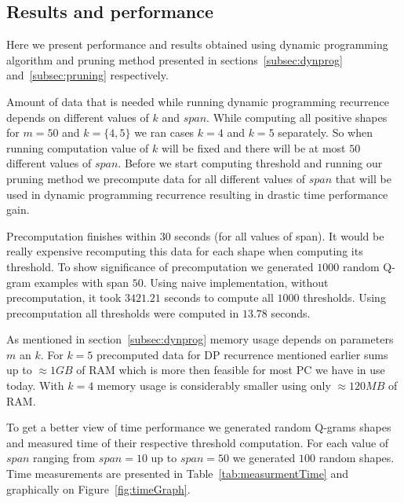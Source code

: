 \documentclass[paper=a4, fontsize=11pt]{scrartcl} %
\numberwithin{equation}{section} %
\numberwithin{figure}{section} %
\numberwithin{table}{section} %
\begin{document}

\subsection{Results and performance}

Here we present performance and results obtained using dynamic programming
algorithm and pruning method presented in sections~\ref{subsec:dynprog}
and~\ref{subsec:pruning} respectively.

Amount of data that is needed while running dynamic programming recurrence
depends on different values of $k$ and $span$. While computing all positive shapes for
$m=50$ and $k=\{4,5\}$ we ran cases $k=4$ and $k=5$ separately. So when running
computation value of $k$ will be fixed and there will be at most $50$ different
values of $span$. Before we start computing threshold and running our pruning
method we precompute data for all different values of $span$ that will be used
in dynamic programming recurrence resulting in drastic time performance gain.

Precomputation finishes within $30$ seconds (for all values of span). It would
be really expensive recomputing this data for each shape when computing its threshold.
To show significance of precomputation we generated $1000$ random Q-gram
examples with span $50$. Using naive implementation, without precomputation, it
took $3421.21$ seconds to compute all $1000$ thresholds. Using precomputation
all thresholds were computed in $13.78$ seconds.

As mentioned in section~\ref{subsec:dynprog} memory usage depends on parameters
$m$ an $k$. For $k=5$ precomputed data for DP recurrence mentioned
earlier sums up to $\approx 1GB$ of RAM which is more then feasible for most PC
we have in use today. With $k=4$ memory usage is considerably smaller using only
$\approx 120MB$ of RAM.

To get a better view of time performance we generated random Q-grams
shapes and measured time of their respective threshold computation. For each
value of $span$ ranging from $span = 10$ up to $span=50$ we generated $100$
random shapes. Time measurements are presented in Table~\ref{tab:measurmentTime}
and graphically on Figure~\ref{fig:timeGraph}.
\end{document}
